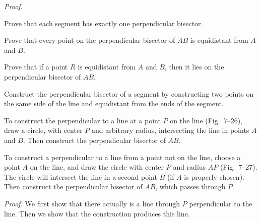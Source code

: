 \documentclass[11pt]{book}
\begin{document}
\noindent\emph{Proof.}
\begin{steps}
\end{steps}

\begin{exercisecols}
\begin{exlist}
\item Prove that each segment has exactly one perpendicular bisector.
\item Prove that every point on the perpendicular bisector of $AB$ is
  equidistant from $A$ and $B$.
\item Prove that if a point $R$ is equidistant from $A$ and $B$, then it lies
  on the perpendicular bisector of $AB$.
\item Construct the perpendicular bisector of a segment by constructing two
  points on the same side of the line and equidistant from the ends of the
  segment.
\end{exlist}
\end{exercisecols}

\begin{construction}
To construct the perpendicular to a line at a point $P$ on the line
(Fig.~7--26), draw a circle, with center $P$ and arbitrary radius, intersecting
the line in points $A$ and $B$. Then construct the perpendicular bisector of
$AB$.
\end{construction}

\begin{construction}
To construct a perpendicular to a line from a point not on the line, choose a
point $A$ on the line, and draw the circle with center $P$ and radius $AP$
(Fig.~7--27). The circle will intersect the line in a second point $B$ (if $A$
is properly chosen). Then construct the perpendicular bisector of $AB$, which
passes through $P$.
\end{construction}

\FIGVIITWENTYSIXSEVENEIGHT

\noindent\emph{Proof.}\quad
We first show that there actually is a line through $P$ perpendicular to the
line. Then we show that the \RC{} construction produces this line.
\end{document}
